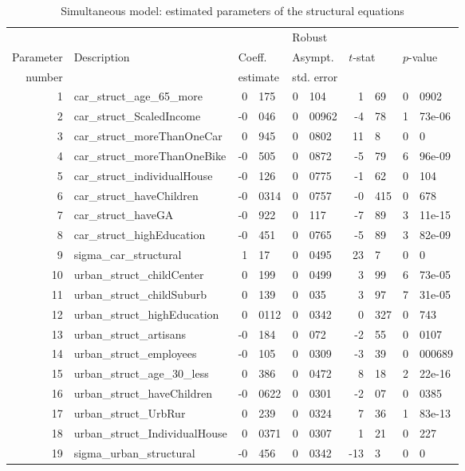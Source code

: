 \documentclass[12pt,a4paper]{article}
\begin{document}
\begin{table}[htb]
    \footnotesize
  \begin{center}
\begin{tabular}{rlr@{.}lr@{.}lr@{.}lr@{.}l}
  &              &   \multicolumn{2}{l}{}         & \multicolumn{2}{l}{Robust}  &  \multicolumn{4}{l}{}  \\
  Parameter & Description & \multicolumn{2}{l}{Coeff.} & \multicolumn{2}{l}{Asympt.} & \multicolumn{2}{l}{$t$-stat} & \multicolumn{2}{l}{$p$-value} \\
  number    &             & \multicolumn{2}{l}{estimate} & \multicolumn{2}{l}{std. error} & \multicolumn{2}{l}{} & \multicolumn{2}{l}{} \\
  \hline
1 & car\_struct\_age\_65\_more & 0&175 & 0&104 & 1&69 & 0&0902 \\ 
2 & car\_struct\_ScaledIncome & -0&046 & 0&00962 & -4&78 & 1&73e-06 \\ 
3 & car\_struct\_moreThanOneCar & 0&945 & 0&0802 & 11&8 & 0&0 \\ 
4 & car\_struct\_moreThanOneBike & -0&505 & 0&0872 & -5&79 & 6&96e-09 \\ 
5 & car\_struct\_individualHouse & -0&126 & 0&0775 & -1&62 & 0&104 \\ 
6 & car\_struct\_haveChildren & -0&0314 & 0&0757 & -0&415 & 0&678 \\ 
7 & car\_struct\_haveGA & -0&922 & 0&117 & -7&89 & 3&11e-15 \\ 
8 & car\_struct\_highEducation & -0&451 & 0&0765 & -5&89 & 3&82e-09 \\ 
9 & sigma\_car\_structural & 1&17 & 0&0495 & 23&7 & 0&0 \\ 
10 & urban\_struct\_childCenter & 0&199 & 0&0499 & 3&99 & 6&73e-05 \\ 
11 & urban\_struct\_childSuburb & 0&139 & 0&035 & 3&97 & 7&31e-05 \\ 
12 & urban\_struct\_highEducation & 0&0112 & 0&0342 & 0&327 & 0&743 \\ 
13 & urban\_struct\_artisans & -0&184 & 0&072 & -2&55 & 0&0107 \\ 
14 & urban\_struct\_employees & -0&105 & 0&0309 & -3&39 & 0&000689 \\ 
15 & urban\_struct\_age\_30\_less & 0&386 & 0&0472 & 8&18 & 2&22e-16 \\ 
16 & urban\_struct\_haveChildren & -0&0622 & 0&0301 & -2&07 & 0&0385 \\ 
17 & urban\_struct\_UrbRur & 0&239 & 0&0324 & 7&36 & 1&83e-13 \\ 
18 & urban\_struct\_IndividualHouse & 0&0371 & 0&0307 & 1&21 & 0&227 \\ 
19 & sigma\_urban\_structural & -0&456 & 0&0342 & -13&3 & 0&0 \\ 

  
\end{tabular}
\caption{Simultaneous model: estimated parameters of the structural equations\label{tab:simultaneous_params_struct}}
  \end{center}
\end{table}
\end{document}
